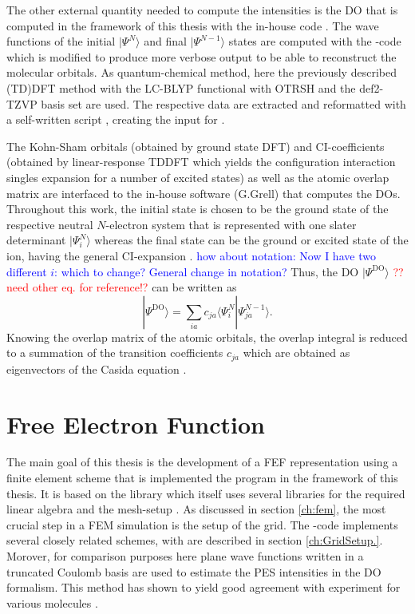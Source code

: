 The other external quantity needed to compute the intensities is the DO that is computed in the framework of this thesis with the in-house code  \cite{MAgg}.
The wave functions of the initial $|\Psi^N\rangle$ and final $|\Psi^{N-1}\rangle$ states are computed with the -code which is modified to produce more verbose output to be able to reconstruct the molecular orbitals.
As quantum-chemical method, here the previously described (TD)DFT method with the LC-BLYP \cite{lcBLYP} functional with OTRSH and the def2-TZVP \cite{def2tzvp} basis set are used.
The respective data are extracted and reformatted with a self-written script \cite{nwc2dy}, creating the input for .

The Kohn-Sham orbitals (obtained by ground state DFT) and CI-coefficients (obtained by linear-response TDDFT which yields the configuration interaction singles expansion for a number of excited states) as well as the atomic overlap matrix are interfaced to the in-house software  \cite{MAgg} (G.Grell) that computes the DOs.
Throughout this work, the initial state is chosen to be the ground state of the respective neutral $N$-electron system that is represented with one slater determinant $|\Psi_i^N\rangle$ whereas the final state can be the ground or excited state of the ion, having the general CI-expansion .
\textcolor{blue}{how about notation: Now I have two different $i$: which to change? General change in notation?}
Thus, the DO $|\Psi^\text{DO}\rangle$  \textcolor{red}{?? need other eq. for reference!?} can be written as
\begin{equation} \label{eq:doCI}
|\Psi^\text{DO}\rangle=\sum_{ia} c_{ja} \langle \Psi_i^N| \Psi_{ja}^{N-1} \rangle.
\end{equation}
Knowing the overlap matrix of the atomic orbitals, the overlap integral  is reduced to a summation of the transition coefficients $c_{ja}$ \cite{MAgg} which are obtained as eigenvectors of the Casida equation .

\section{Free Electron Function}
\label{sec:grid}
The main goal of this thesis is the development of a FEF representation using a finite element scheme that is implemented the program  \cite{FreeWilly} in the framework of this thesis.
It is based on the library  \cite{libmesh} which itself uses several libraries for the required linear algebra \cite{petsc, slepc1,eigen} and the mesh-setup \cite{tetgen,qhull}.
As discussed in section \ref{ch:fem}, the most crucial step in a FEM simulation is the setup of the grid.
The -code implements several closely related schemes, with are described in section \ref{ch:GridSetup.}.
Morover, for comparison purposes here plane wave functions written in a truncated Coulomb basis are used to estimate the PES intensities in the DO formalism.
This method has shown to yield good agreement with experiment for various molecules \cite{ezDyson,GrellKuehn,DO_TDDFT}.

